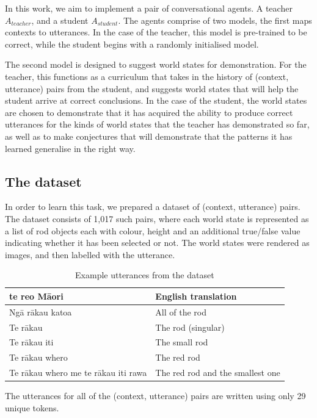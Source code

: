 In this work, we aim to implement a pair of conversational agents. A teacher $A_{teacher}$, and a student $A_{student}$. The agents comprise of two models, the first maps contexts to utterances. In the case of the teacher, this model is pre-trained to be correct, while the student begins with a randomly initialised model.

The second model is designed to suggest world states for demonstration. For the teacher, this functions as a curriculum that takes in the history of (context, utterance) pairs from the student, and suggests world states that will help the student arrive at correct conclusions. In the case of the student, the world states are chosen to demonstrate that it has acquired the ability to produce correct utterances for the kinds of world states that the teacher has demonstrated so far, as well as to make conjectures that will demonstrate that the patterns it has learned generalise in the right way.

\subsection{The dataset}

In order to learn this task, we prepared a dataset of (context, utterance) pairs. The dataset consists of 1,017 such pairs, where each world state is represented as a list of rod objects each with colour, height and an additional true/false value indicating whether it has been selected or not. The world states were rendered as images, and then labelled with the utterance.

\begin{table}[h]
  \centering
  \begin{tabular}{|p{3cm}|p{3cm}|}
    \hline
    te reo Māori & English translation \\ \hline
    Ngā rākau katoa & All of the rod \\ \hline
    Te rākau         & The rod (singular)  \\ \hline
    Te rākau iti     & The small rod  \\ \hline
    Te rākau whero   & The red rod  \\ \hline
    Te rākau whero me te rākau iti rawa & The red rod and the smallest one \\ \hline
  \end{tabular}
  \caption{Example utterances from the dataset}
  \label{tab:example_table}
\end{table}

The utterances for all of the (context, utterance) pairs are written using only 29 unique tokens.

